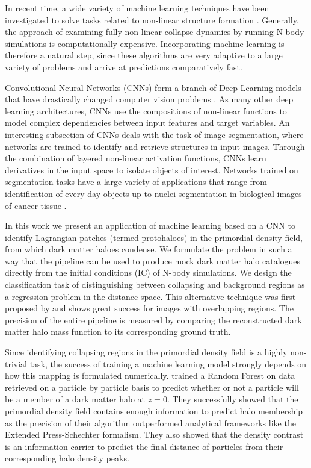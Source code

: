 \documentclass[fleqn,usenatbib]{mnras}
\begin{document}
In recent time, a wide variety of machine learning techniques have been investigated to solve tasks related to non-linear structure formation \cite[e.g.][]{Berger2019, Calvo2019, He2018, LucieSmith2018, Zhang2019, Agarwal2018}. Generally, the approach of examining fully non-linear collapse dynamics by running N-body simulations is computationally expensive. Incorporating machine learning is therefore a natural step, since these algorithms are very adaptive to a large variety of problems and arrive at predictions comparatively fast.\par
Convolutional Neural Networks (CNNs) form a branch of Deep Learning models that have drastically changed computer vision problems \cite[][]{Krizhevsky2012}. As many other deep learning architectures, CNNs use the compositions of non-linear functions to model complex dependencies between input features and target variables. An interesting subsection of CNNs deals with the task of image segmentation, where networks are trained to identify and retrieve structures in input images. Through the combination of layered non-linear activation functions, CNNs learn derivatives in the input space to isolate objects of interest. Networks trained on segmentation tasks have a large variety of applications that range from identification of every day objects \cite[e.g.][]{Liu2015, Noh2015} up to nuclei segmentation in biological images of cancer tissue \cite[e.g.][]{Milletari2016, Naylor2019, Isensee2018}.\par
In this work we present an application of machine learning based on a CNN to identify Lagrangian patches (termed protohaloes) in the primordial density field, from which dark matter haloes condense. We formulate the problem in such a way that the pipeline can be used to produce mock dark matter halo catalogues directly from the initial conditions (IC) of N-body simulations. We design the classification task of distinguishing between collapsing and background regions as a regression problem in the distance space. This alternative technique was first proposed by \cite{Naylor2019} and shows great success for images with overlapping regions. The precision of the entire pipeline is measured by comparing the reconstructed dark matter halo mass function to its corresponding ground truth.\par
Since identifying collapsing regions in the primordial density field is a highly non-trivial task, the success of training a machine learning model strongly depends on how this mapping is formulated numerically.
\cite{LucieSmith2018} trained a Random Forest on data retrieved on a particle by particle basis to predict whether or not a particle will be a member of a dark matter halo at $z=0$. They successfully showed that the primordial density field contains enough information to predict halo membership as the precision of their algorithm outperformed analytical frameworks like the Extended Press-Schechter formalism. They also showed that the density contrast is an information carrier to predict the final distance of particles from their corresponding halo density peaks.\par
\end{document}
